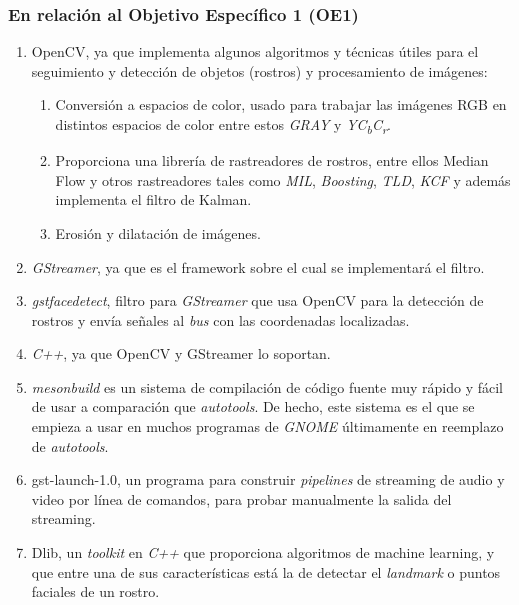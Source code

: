 \documentclass[a4paper,openright,12pt]{report}
\begin{document}
\subsubsection{En relación al Objetivo Específico 1 (OE1)}
\begin{enumerate}
    \item OpenCV, ya que implementa algunos algoritmos y técnicas
        útiles para el seguimiento y detección de objetos (rostros) y
        procesamiento de imágenes:
    \begin{enumerate}
        \item Conversión a espacios de color, usado para trabajar las imágenes
            RGB en distintos espacios de color entre estos \textit{GRAY} y
            \textit{YC\textsubscript{b}C\textsubscript{r}}.
        \item Proporciona una librería de rastreadores de rostros, entre ellos
            Median Flow y otros rastreadores tales como \textit{MIL},
            \textit{Boosting}, \textit{TLD}, \textit{KCF} y además implementa
            el filtro de Kalman.
        \item Erosión y dilatación de imágenes.
    \end{enumerate}
    \item \textit{GStreamer}, ya que es el framework sobre el cual se
        implementará el filtro.
    \item \textit{\gls{gstfacedetect}}, filtro para \textit{GStreamer} que usa OpenCV
        para la detección de rostros y envía señales al \textit{bus} con las
        coordenadas localizadas.
    \item \textit{C++}, ya que OpenCV y GStreamer lo soportan.
    \item \textit{mesonbuild} es un sistema de compilación de código fuente muy
    rápido \cite{mesonbuildComparison} y fácil de usar a comparación que
    \textit{autotools}. De hecho, este sistema es el que se empieza a usar en
    muchos programas de \textit{GNOME} últimamente en reemplazo de \textit{autotools}.
    \item gst-launch-1.0, un programa para construir \textit{pipelines} de
    streaming de audio y video por línea de comandos, para probar manualmente
    la salida del streaming.
    \item Dlib, un \textit{toolkit} en \textit{C++} que proporciona algoritmos
    de machine learning, y que entre una de sus características está la de
    detectar el \textit{landmark} o puntos faciales de un rostro.
\end{enumerate}
\end{document}
